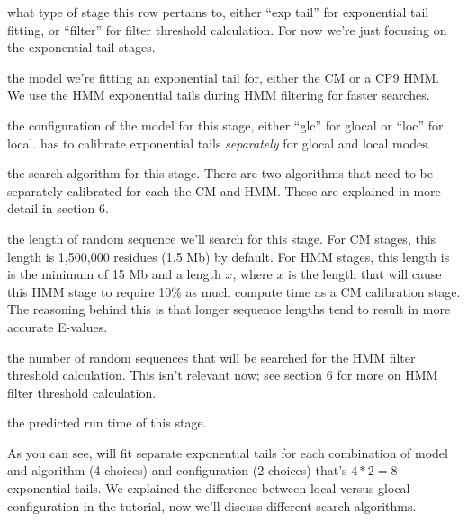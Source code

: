 \begin{wideitem}
\item[\emprog{stage}] what type of stage this row pertains to, either
  ``exp tail'' for exponential tail fitting, or ``filter'' for filter
  threshold calculation. For now we're just focusing on the exponential tail
  stages. 

\item[\emprog{mod}] the model we're fitting an exponential tail for,
  either the CM or a CP9 HMM. We use the HMM exponential tails during
  HMM filtering for faster searches.

\item[\emprog{cfg}] the configuration of the model for this stage,
  either ``glc'' for glocal or ``loc'' for local. 
  has to calibrate exponential tails \emph{separately} for glocal and
  local modes.

\item[\emprog{alg}] the search algorithm for this stage. There are two
  algorithms that need to be separately calibrated for each the CM and
  HMM. These are explained in more detail in section 6.

\item[\emprog{expL}] the length of random sequence we'll search for
  this stage. For CM stages, this length is 1,500,000 residues (1.5 Mb)
  by default. For HMM stages, this length is is the minimum
  of 15 Mb and a length $x$, where $x$ is the length that will cause
  this HMM stage to require 10\% as much compute time as a CM
  calibration stage. The reasoning behind this is that longer sequence
  lengths tend to result in more accurate E-values.

\item[\emprog{filN}] the number of random sequences that will be
  searched for the HMM filter threshold calculation. This isn't
  relevant now; see section 6 for more on HMM filter threshold
  calculation. 

\item[\emprog{predicted time}] the predicted run time of this stage. 

\end{wideitem}

As you can see,  will fit separate exponential tails
for each combination of model and algorithm (4 choices) and configuration
(2 choices) that's $4*2=8$ exponential
tails. We explained the difference between local versus glocal
configuration in the tutorial, now we'll discuss different search algorithms. 

